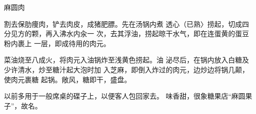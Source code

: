 \begin{recipe}{麻圆肉}

\ingredients


\cooking

\step 	割去保肋痩肉，铲去肉皮，成猪肥膘。先在汤锅内煮 透心（已熟〉捞起，切成四分见方的颗，再入沸水内汆一 次，去其浮油，捞起晾干水气，即在连蛋黄的蛋豆粉内裹上 一层，即成待用的肉元。

\step 	菜油烧至八成火，将肉元入油锅炸至浅黄色捞起。油 泌尽后，在锅内放入白糖及少许清水，炒至糖汁起大泡时加 入芝麻，即倒入炸过的肉元，边炒边将锅几颠，使肉元裹糖 起锅。敞风，糖即干，盛盘。

\notes

以前多用于一般席桌的碟子上，以便客人包回家去。 味香甜，很象糖果店“麻圆果子”，故名。

\end{recipe}

